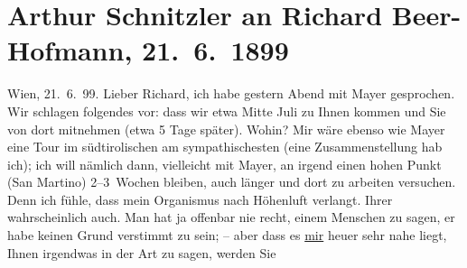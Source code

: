 

               \section[Arthur Schnitzler an Richard Beer-Hofmann, 21. 6. 1899]{ Arthur Schnitzler an Richard Beer-Hofmann, 21. 6. 1899}\nopagebreak{}\rehead{ }\begin{ledgroupsized}[t]{13cm}\normalsize\beginnumbering{} \toendnotes[C]{\smallbreak\pagebreak[2]} 
\toendnotes[C]{\smallbreak}\pstart
           \raggedleft{}{\pb}Wien, 21. 6. 99.\pend
           \pstart
           Lieber Richard, ich habe gestern Abend mit Mayer gesprochen. Wir schlagen folgendes vor: dass wir etwa
                  Mitte Juli zu Ihnen kommen und Sie von dort mitnehmen (etwa 5 Tage
               später). Wohin? Mir wäre ebenso wie Mayer eine
               Tour im südtirolischen am sympathischesten (eine
               Zusammenstellung hab ich); ich will nämlich dann, vielleicht mit Mayer, an irgend einen hohen Punkt (San Martino) 2–3 Wochen bleiben, auch länger und dort zu
               arbeiten versuchen. Denn ich fühle, dass mein Organismus nach Höhenluft verlangt.
               Ihrer wahrscheinlich auch. Man hat ja offenbar nie recht, einem Menschen zu sagen, er
               habe keinen Grund verstimmt zu sein; – aber dass es \uline{mir} heuer sehr nahe liegt, Ihnen irgendwas in der Art zu sagen, werden Sie

\end{ledgroupsized}
